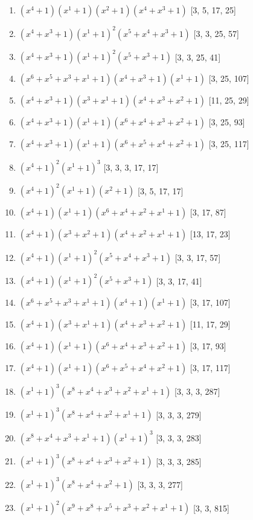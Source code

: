 \documentclass[10pt,twocolumn]{article}
\begin{document}
\begin{enumerate}
\item $(x^{4} + 1)(x^{1} + 1)(x^{2} + 1)(x^{4} + x^{3} + 1)$  [3, 5, 17, 25]
\item $(x^{4} + x^{3} + 1)(x^{1} + 1)^{2}(x^{5} + x^{4} + x^{3} + 1)$  [3, 3, 25, 57]
\item $(x^{4} + x^{3} + 1)(x^{1} + 1)^{2}(x^{5} + x^{3} + 1)$  [3, 3, 25, 41]
\item $(x^{6} + x^{5} + x^{3} + x^{1} + 1)(x^{4} + x^{3} + 1)(x^{1} + 1)$  [3, 25, 107]
\item $(x^{4} + x^{3} + 1)(x^{3} + x^{1} + 1)(x^{4} + x^{3} + x^{2} + 1)$  [11, 25, 29]
\item $(x^{4} + x^{3} + 1)(x^{1} + 1)(x^{6} + x^{4} + x^{3} + x^{2} + 1)$  [3, 25, 93]
\item $(x^{4} + x^{3} + 1)(x^{1} + 1)(x^{6} + x^{5} + x^{4} + x^{2} + 1)$  [3, 25, 117]
\item $(x^{4} + 1)^{2}(x^{1} + 1)^{3}$  [3, 3, 3, 17, 17]
\item $(x^{4} + 1)^{2}(x^{1} + 1)(x^{2} + 1)$  [3, 5, 17, 17]
\item $(x^{4} + 1)(x^{1} + 1)(x^{6} + x^{4} + x^{2} + x^{1} + 1)$  [3, 17, 87]
\item $(x^{4} + 1)(x^{3} + x^{2} + 1)(x^{4} + x^{2} + x^{1} + 1)$  [13, 17, 23]
\item $(x^{4} + 1)(x^{1} + 1)^{2}(x^{5} + x^{4} + x^{3} + 1)$  [3, 3, 17, 57]
\item $(x^{4} + 1)(x^{1} + 1)^{2}(x^{5} + x^{3} + 1)$  [3, 3, 17, 41]
\item $(x^{6} + x^{5} + x^{3} + x^{1} + 1)(x^{4} + 1)(x^{1} + 1)$  [3, 17, 107]
\item $(x^{4} + 1)(x^{3} + x^{1} + 1)(x^{4} + x^{3} + x^{2} + 1)$  [11, 17, 29]
\item $(x^{4} + 1)(x^{1} + 1)(x^{6} + x^{4} + x^{3} + x^{2} + 1)$  [3, 17, 93]
\item $(x^{4} + 1)(x^{1} + 1)(x^{6} + x^{5} + x^{4} + x^{2} + 1)$  [3, 17, 117]
\item $(x^{1} + 1)^{3}(x^{8} + x^{4} + x^{3} + x^{2} + x^{1} + 1)$  [3, 3, 3, 287]
\item $(x^{1} + 1)^{3}(x^{8} + x^{4} + x^{2} + x^{1} + 1)$  [3, 3, 3, 279]
\item $(x^{8} + x^{4} + x^{3} + x^{1} + 1)(x^{1} + 1)^{3}$  [3, 3, 3, 283]
\item $(x^{1} + 1)^{3}(x^{8} + x^{4} + x^{3} + x^{2} + 1)$  [3, 3, 3, 285]
\item $(x^{1} + 1)^{3}(x^{8} + x^{4} + x^{2} + 1)$  [3, 3, 3, 277]
\item $(x^{1} + 1)^{2}(x^{9} + x^{8} + x^{5} + x^{3} + x^{2} + x^{1} + 1)$  [3, 3, 815]

\end{enumerate}
\end{document}
